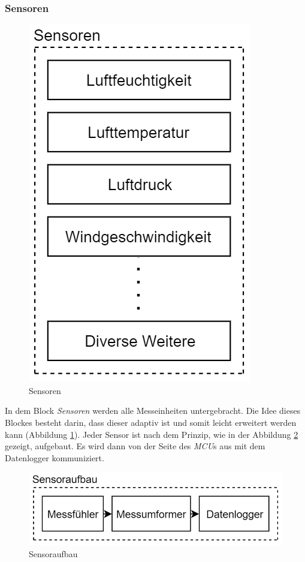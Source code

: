 \newpage
\subsubsection{Sensoren}
\begin{figure}[h]
\centering
\includegraphics[scale=0.8]{graphics/Sensoren.PNG}
\caption{Sensoren}
\label{fig:sensoren}
\end{figure}
In dem Block \textit{Sensoren} werden alle Messeinheiten untergebracht. Die Idee dieses Blockes besteht darin, dass dieser adaptiv ist und somit leicht erweitert werden kann (Abbildung \ref{fig:sensoren}). Jeder Sensor ist nach dem Prinzip, wie in der Abbildung \ref{fig:sensoraufbau} gezeigt, aufgebaut. Es wird dann von der Seite des \textit{MCU}s aus mit dem Datenlogger kommuniziert.\\

\begin{figure}[h]
\centering
\includegraphics[scale=0.7]{graphics/Sensoraufbau.PNG}
\caption{Sensoraufbau}
\label{fig:sensoraufbau}
\end{figure}

